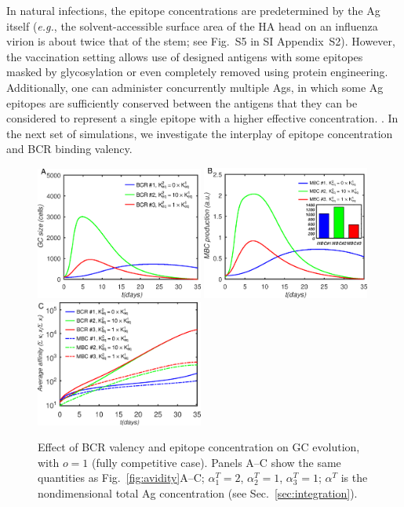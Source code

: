 \documentclass[utf8]{frontiersHLTH}%
\def\eg {{\it e.g.}}
\newcommand{\fig}[1]{Fig.~\ref{fig:#1}}
\newcommand{\Sec}[1]{Sec.~\ref{sec:#1}}
\renewcommand{\sec}[1]{\Sec{#1}}
\newcommand{\SI}{SI Appendix}
\newcommand{\hfig}[1]{#1} %
\begin{document}
In natural infections, the epitope concentrations are predetermined by the Ag itself (\eg,
the solvent-accessible surface area of the HA head on an influenza virion
is about twice that of the stem; see Fig.~S5 in \SI~S2).
%
However, the vaccination setting allows use of designed antigens with
some epitopes masked by glycosylation\cite{bajic19,eggink14,zhou17} or
even completely removed using protein engineering\cite{yassine15,corbett19}. Additionally, one can
administer concurrently multiple Ags, in which some Ag epitopes are
sufficiently conserved between the antigens that they can be considered
to represent a single epitope with a higher effective concentration.
\cite{kanekiyo19,Boyoglu-Barnum20,cohen21,glanville20}.
In the next set of simulations, we investigate the interplay of epitope
concentration and BCR binding valency.
%
\hfig{
\begin{figure}
\centering
\includegraphics[width=0.49\textwidth]{../fig7/gcsize.eps}
\includegraphics[width=0.49\textwidth]{../fig7/dmbc.eps}
\includegraphics[width=0.49\textwidth]{../fig7/A.eps}
\caption{Effect of BCR valency and epitope concentration on GC evolution, with $o=1$ (fully competitive case).
Panels A--C show the same quantities as \fig{avidity}A--C;
$\alpha_1^T=2$, $\alpha_2^T=1$, $\alpha_3^T=1$; $\alpha^T$ is the nondimensional total Ag concentration (see \sec{integration}).
}
\label{fig:agc1}
\end{figure}
}
\end{document}
